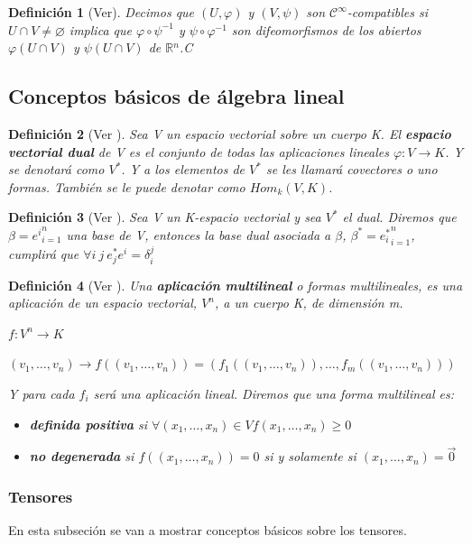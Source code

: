 \documentclass[pdftex,11pt,a4paper]{book}
\newtheorem{defi}{Definici\'on}
\newcommand{\Cinf}{ $\mathscr{C}^\infty$}
\newcommand{\R}{$\mathbb{R}$}
\newcommand{\x}{(x_1, \ldots,x_n)}
\renewcommand{\emptyset}{\varnothing}
\begin{document}
\begin{defi}[Ver\cite{Fomenko}] 
Decimos que $(U, \varphi)$ y $(V, \psi)$ son  \Cinf -compatibles si $U \cap V \neq \emptyset$ implica que $\varphi \circ \psi^{-1} $ y $ \psi \circ \varphi^{-1}$ son difeomorfismos de los abiertos $\varphi(U \cap V )$ y $\psi(U \cap V )$ de \R$^n$.C
\end{defi}

\subsection{Conceptos básicos de álgebra lineal}
\begin{defi}[Ver \cite{algebralineal}]
Sea V un espacio vectorial sobre un cuerpo K. El \textbf{espacio vectorial dual} de V es el conjunto de todas las aplicaciones lineales $\varphi :V \to K$. Y se denotará como $V^*$.
Y a los elementos de $V^*$ se les llamará covectores o uno formas. 
También se le puede denotar como $Hom_k(V,K)$.
\end{defi}

\begin{defi}[Ver \cite{algebralineal}]
Sea V un K-espacio vectorial y sea $V^*$ el dual. Diremos que $\beta = {e^i}_{i=1}^n$ una base de V, entonces la base dual asociada a $\beta$, $\beta^* = {e_i^*}_{i=1}^n$, cumplirá que 
$\forall i\ j \ e^*_j e^i = \delta_i^j$ 
\end{defi}


\begin{defi}[Ver \cite{algebralineal}]
Una \textbf{aplicación multilineal} o formas multilineales, es una aplicación de un espacio vectorial, $V^n$, a un cuerpo K, de dimensión m. 
\begin{center}
$ f:V^n \to K$

$(v_1, \ldots, v_n) \to f((v_1, \ldots, v_n))= (f_1((v_1, \ldots, v_n)), \ldots, f_m((v_1, \ldots, v_n) ) )$
\end{center}
Y para cada $f_i$ será una aplicación lineal. 
Diremos que una forma multilineal es: 
\begin{itemize}
    \item \textbf{definida positiva} si $\forall \x \in V f \x \geq 0$ 
    \item \textbf{no degenerada} si $f(\x) = 0$ si y solamente si $\x = \vec{0}$
    
\end{itemize}
\end{defi}


\subsubsection{Tensores}
En esta subseción se van a mostrar conceptos básicos sobre los tensores. 
\end{document}
